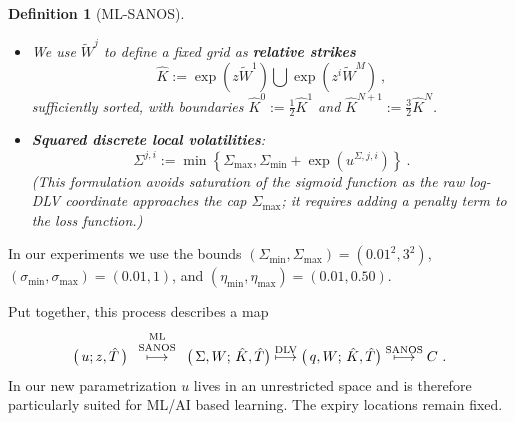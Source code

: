 \documentclass[11pt,a4paper]{article}
\newtheorem{definition}{Definition}[section]
\DeclareRobustCommand{\supstack}[2]{\stackrel{\mbox{{\scriptsize ${#1}$}}}{ {#2} }}     %
\begin{document}
\begin{definition}[ML-SANOS]
\begin{itemize}
\begin{equation}
            \end{equation}
            With these quantities define the \textbf{total volatilities}
             \begin{equation}\label{eq:totalW}
             \widetilde W^j := \sum_{\ell=1}^{j} \sigma^\ell \sqrt{\Delta\hat T^\ell}
             \qquad\mbox{and}\qquad
             W^j := \eta^{\mathrm f} \sigma^1 \sqrt{\Delta\hat T^1}\ + \eta^{\mathrm{term}} \sum_{\ell=2}^{j}  \sigma^\ell \sqrt{\Delta\hat T^\ell}\ .
             \end{equation}
        \item We use $\widetilde W^j$ to define a fixed grid as \textbf{relative strikes}
              \begin{equation}\label{eq:constructK}
                \hat K := \exp\left( z \widetilde W^1 \right) \bigcup \exp\left( z^i \widetilde W^M \right) \ ,
              \end{equation}
              sufficiently sorted,
              with boundaries $\hat K^{0}:=\frac12 \hat K^{1}$ and $\hat K^{N+1} := \frac32 \hat K^{N}$.
        \item \textbf{Squared discrete local volatilities}:
              \begin{equation}\label{eq:defDLVdsq}
                 \Sigma^{j,i}
                 :=\min\!\left\{\Sigma_{\max},
                    \Sigma_{\min}+\exp(u^{\Sigma,j,i})\right\}\ .
              \end{equation}
              (This formulation avoids saturation of the sigmoid function as the raw log-DLV coordinate approaches the cap  $\Sigma_{\max}$;
              it requires adding a penalty term to the loss function.)

    \end{itemize}
\end{definition}
In our
experiments we use the bounds
$(\Sigma_{\min},\Sigma_{\max})=(0.01^2,3^2)$,
$(\sigma_{\min},\sigma_{\max})=(0.01,1)$, and
$(\eta_{\min},\eta_{\max})=(0.01,0.50)$.

Put together, this process describes a map
    \begin{equation}
        \big(\,u;z,\hat T\,\big)  \supstack{
            \begin{array}{c}
                \mathrm{ML}\\
                \mathrm{SANOS}
                \end{array}
        }\longmapsto \big(\, \Sigma,W;\,\hat K,\hat T \big)
        \supstack{\mathrm{DLV}}\longmapsto \big(\,q,W;\,\hat K,\hat T \big)  \supstack{\mathrm{SANOS}}\longmapsto C \ .
    \end{equation}
    In our new parametrization $u$ lives in an unrestricted space and is therefore
    particularly suited for ML/AI based learning.  The expiry locations remain fixed.
\end{document}
